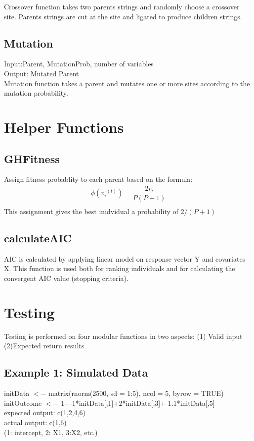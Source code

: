 \documentclass{article}\usepackage[]{graphicx}\usepackage[]{color}
\begin{document}
Crossover function takes two parents strings and randomly choose a crossover site. Parents strings are cut at the site and ligated to produce children strings.
\subsection{Mutation}
Input:Parent, MutationProb, number of variables\\
Output: Mutated Parent \\

Mutation function takes a parent and mutates one or more sites according to the mutation probability.\\
\section{Helper Functions}
\subsection{GHFitness}
Assign fitness probablity to each parent based on the formula:
\begin{gather*}
\phi({v_i}^{(t)}) = \dfrac{2r_i}{P(P+1)}\\
\end{gather*}
This assignment gives the best inidvidual a probability of \(2/(P+1)\)
\subsection{calculateAIC}
AIC is calculated by applying linear model on response vector Y and covariates X. This function is used both for ranking individuals and for calculating the convergent AIC value (stopping criteria).

\section{Testing}
Testing is performed on four modular functions in two aspects: (1) Valid input (2)Expected return results
\subsection{Example 1: Simulated Data}
initData \(<-\) matrix(rnorm(2500, sd = 1:5), ncol = 5, byrow = TRUE)\\
initOutcome \(<-\) 1+-1*initData[,1]+2*initData[,3]+ 1.1*initData[,5]\\
expected output: c(1,2,4,6) \\
actual output: c(1,6)\\
(1: intercept, 2: X1, 3:X2, etc.)\\
\end{document}
